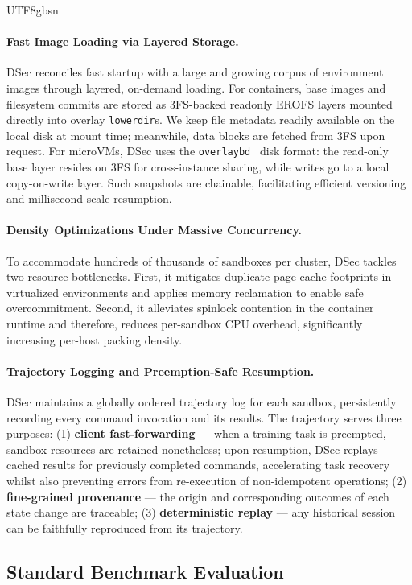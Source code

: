 \documentclass[11pt, a4paper, logo, copyright, nonumbering]{deepseek}
\begin{document}
\begin{CJK*}{UTF8}{gbsn}
\paragraph{Fast Image Loading via Layered Storage.} 
DSec reconciles fast startup with a large and growing corpus of environment images through layered, on-demand loading. 
For containers, base images and filesystem commits are stored as 3FS-backed readonly EROFS layers mounted directly into overlay \texttt{lowerdir}s. 
We keep file metadata readily available on the local disk at mount time; meanwhile, data blocks are fetched from 3FS upon request.
For microVMs, DSec uses the \texttt{overlaybd}~\citep{overlaybd} disk format: the read-only base layer resides on 3FS for cross-instance sharing, while writes go to a local copy-on-write layer. 
Such snapshots are chainable, facilitating efficient versioning and millisecond-scale resumption.

\paragraph{Density Optimizations Under Massive Concurrency.} 
To accommodate hundreds of thousands of sandboxes per cluster, DSec tackles two resource bottlenecks.
First, it mitigates duplicate page-cache footprints in virtualized environments and applies memory reclamation to enable safe overcommitment. 
Second, it alleviates spinlock contention in the container runtime and therefore, reduces per-sandbox CPU overhead, significantly increasing per-host packing density. 

\paragraph{Trajectory Logging and Preemption-Safe Resumption.} 
DSec maintains a globally ordered trajectory log for each sandbox, persistently recording every command invocation and its results. 
The trajectory serves three purposes: 
(1) \textbf{client fast-forwarding} --- when a training task is preempted, sandbox resources are retained nonetheless; upon resumption, DSec replays cached results for previously completed commands, accelerating task recovery whilst also preventing errors from re-execution of non-idempotent operations;
(2) \textbf{fine-grained provenance} --- the origin and corresponding outcomes of each state change are traceable;
(3) \textbf{deterministic replay} --- any historical session can be faithfully reproduced from its trajectory.

\subsection{Standard Benchmark Evaluation}


\end{CJK*}
\end{document}

